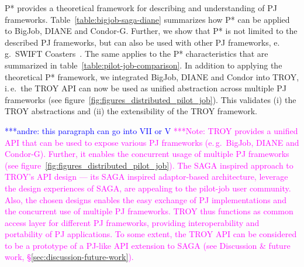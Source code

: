 \documentclass[conference,final]{IEEEtran}
\newcommand{\jhanote}[1]{ {\textcolor{red} { ***shantenu: #1 }}}
\newcommand{\alnote}[1]{ {\textcolor{blue} { ***andre: #1 }}}
\newcommand{\note}[1]{ {\textcolor{magenta} { ***Note: #1 }}}
\newcommand{\alnote}[1]{}
\newcommand{\jhanote}[1]{}
\newcommand{\note}[1]{}
\begin{document}
P* provides a theoretical framework for describing and understanding of PJ
frameworks. Table~\ref{table:bigjob-saga-diane} summarizes how P* can be applied
to BigJob, DIANE and Condor-G. Further, we show that P* is not limited to the
described PJ frameworks, but can also be used with other PJ frameworks, e.\,g.\
SWIFT Coasters~\cite{coasters}. The same applies to the P* characteristics 
that
are summarized in table~\ref{table:pilot-job-comparison}. In addition to
applying the theoretical P* framework, we integrated BigJob, DIANE and Condor
into TROY, i.\,e.\ the TROY API can now be used as unified abstraction across
multiple PJ frameworks (see figure~\ref{fig:figures_distributed_pilot_job}).
This validates (i) the TROY abstractions and (ii) the extensibility of the TROY
framework.


\alnote{this paragraph can go into VII or V} \note{TROY provides a
  unified API that can be used to expose various PJ frameworks
  (e.\,g.\ BigJob, DIANE and Condor-G). Further, it enables the
  concurrent usage of multiple PJ frameworks (see
  figure~\ref{fig:figures_distributed_pilot_job}). The SAGA inspired
  approach to TROY's API design --- its SAGA inspired adaptor-based
  architecture, leverage the design experiences of SAGA, are appealing
  to the pilot-job user community. Also, the chosen designs enables
  the easy exchange of PJ implementations and the concurrent use of
  multiple PJ frameworks. TROY thus functions as common access layer
  for different PJ frameworks, providing interoperability and
  portability of PJ applications. To some extent, the TROY API can be
  considered to be a prototype of a PJ-like API extension to SAGA (see
  Discussion \& future work, \S\ref{sec:discussion-future-work}).}







\end{document}
